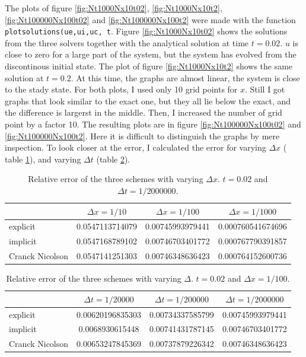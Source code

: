 \documentclass{article}
\begin{document}
The plots of figure \ref{fig:Nt1000Nx10t02}, \ref{fig:Nt1000Nx10t2}, \ref{fig:Nt100000Nx100t02} and \ref{fig:Nt100000Nx100t2} were made with the function \texttt{plotsolutions(ue,ui,uc, t}. Figure \ref{fig:Nt1000Nx10t02} shows the solutions from the three solvers together with the analytical solution at time $t=0.02$. $u$ is close to zero for a large part of the system, but the system has evolved from the discontinous initial state. The plot of figure \ref{fig:Nt1000Nx10t2} shows the same solution at $t=0.2$. At this time, the graphs are almost linear, the system is close to the stady state. For both plots, I used only 10 grid points for $x$. Still I got graphs that look similar to the exact one, but they all lie below the exact, and the difference is largerst in the middle. Then, I increased the number of grid point by a factor 10. The resulting plots are in figure \ref{fig:Nt100000Nx100t02} and \ref{fig:Nt100000Nx100t2}. Here it is difficult to distinguish the graphs by mere inspection. To look closer at the error, I calculated the error for varying $\Delta x $ ( table \ref{tab:table1}), and varying $\Delta t$ (table \ref{tab:table2}). 

\begin{table}[h!]
  \centering
  \caption{Relative error of the three schemes with varying $\Delta x$. $t=0.02$ and $\Delta t = 1/2000000$.}
  \label{tab:table1}
  \begin{tabular}{l||c|c|c}
    & $\Delta x = 1/10$ & $\Delta x = 1/100$ & $\Delta x = 1/1000$ \\
    \hline
    explicit & 0.0547113714079 & 0.00745993979441 & 0.000760541674696\\
    \hline
    implicit & 0.0547168789102 & 0.00746703401772  & 0.000767790391857\\
    \hline
    Cranck Nicolson & 0.0547141251303 & 0.00746348636423 & 0.000764152600736\\
  \end{tabular}
\end{table}

\begin{table}[h!]
  \centering
  \caption{Relative error of the three schemes with varying $\Delta $. $t=0.02$ and $\Delta x = 1/100$.}
  \label{tab:table2}
  \begin{tabular}{l||c|c|c}
    & $\Delta t = 1/20000$ & $\Delta t = 1/200000$ & $\Delta t = 1/2000000$ \\
    \hline
    explicit & 0.00620196835303 &  0.00734337585799 & 0.00745993979441\\
    \hline
    implicit & 0.0068930615448 & 0.00741431787145 & 0.00746703401772\\
    \hline
    Cranck Nicolson & 0.00653247845369 & 0.00737879226342 & 0.00746348636423\\
  \end{tabular}
\end{table}
\end{document}
